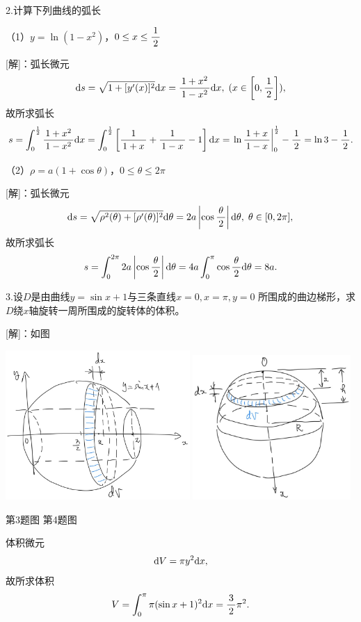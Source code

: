 \bs

2.计算下列曲线的弧长

（1）$y=\ln(1-x^2)$，$0\leq x\leq\df12$

[解]：弧长微元
$$\d s=\sqrt{1+[y'(x)]^2}\d x=\df{1+x^2}{1-x^2}\d
x,\;(x\in\left[0,\df12\right]),$$
故所求弧长
$$s=\dint_0^{\frac12}\df{1+x^2}{1-x^2}\d x
=\dint_0^{\frac12}\left[\df1{1+x}+\df1{1-x}-1\right]\d x
=\left.\ln\df{1+x}{1-x}\right|_0^{\frac12}-\df12
=\ln3-\df12.$$

（2）$\rho=a(1+\cos\theta)$，$0\leq\theta\leq2\pi$

[解]：弧长微元
$$\d s=\sqrt{\rho^2(\theta)+[\rho'(\theta)]^2}\d\theta
=2a\left|\cos\df{\theta}2\right|\d\theta,\;\theta\in[0,2\pi],$$
故所求弧长
$$s=\dint_0^{2\pi}2a\left|\cos\df{\theta}2\right|\d\theta
=4a\dint_0^{\pi}\cos\df{\theta}2\d\theta
=8a.$$
\fin

\bs

3.设$D$是由曲线$y=\sin x+1$与三条直线$x=0,x=\pi,y=0$
所围成的曲边梯形，求$D$绕$x$轴旋转一周所围成的旋转体的体积。

[解]：如图
\begin{center}
	\includegraphics[width=7cm]{./images/ch6/sinx1cs.jpg}
	\includegraphics[width=6cm]{./images/ch6/topSp.jpg}
	
	{\kaishu 第3题图\hspace{6cm} 第4题图}
\end{center}
体积微元
$$\d V=\pi y^2\d x,$$
故所求体积
$$
	V=\dint_0^{\pi}\pi(\sin x+1)^2\d x=\df32\pi^2.
$$
\fin

